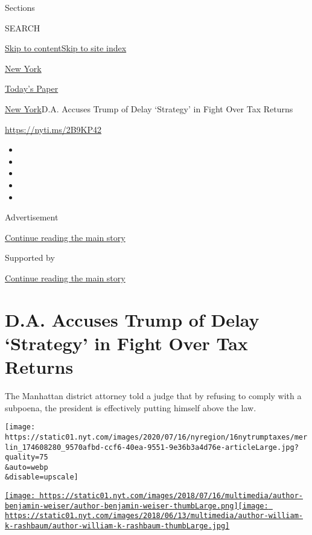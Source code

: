 Sections

SEARCH

\protect\hyperlink{site-content}{Skip to
content}\protect\hyperlink{site-index}{Skip to site index}

\href{https://www.nytimes.com/section/nyregion}{New York}

\href{https://myaccount.nytimes.com/auth/login?response_type=cookie\&client_id=vi}{}

\href{https://www.nytimes.com/section/todayspaper}{Today's Paper}

\href{/section/nyregion}{New York}\textbar{}D.A. Accuses Trump of Delay
`Strategy' in Fight Over Tax Returns

\url{https://nyti.ms/2B9KP42}

\begin{itemize}
\item
\item
\item
\item
\item
\end{itemize}

Advertisement

\protect\hyperlink{after-top}{Continue reading the main story}

Supported by

\protect\hyperlink{after-sponsor}{Continue reading the main story}

\hypertarget{da-accuses-trump-of-delay-strategy-in-fight-over-tax-returns}{%
\section{D.A. Accuses Trump of Delay `Strategy' in Fight Over Tax
Returns}\label{da-accuses-trump-of-delay-strategy-in-fight-over-tax-returns}}

The Manhattan district attorney told a judge that by refusing to comply
with a subpoena, the president is effectively putting himself above the
law.

\texttt{[image: https://static01.nyt.com/images/2020/07/16/nyregion/16nytrumptaxes/merlin\_174608280\_9570afbd-ccf6-40ea-9551-9e36b3a4d76e-articleLarge.jpg?quality=75\\\&auto=webp\\\&disable=upscale]}

\href{https://www.nytimes.com/by/benjamin-weiser}{\texttt{[image: https://static01.nyt.com/images/2018/07/16/multimedia/author-benjamin-weiser/author-benjamin-weiser-thumbLarge.png]}}\href{https://www.nytimes.com/by/william-k-rashbaum}{\texttt{[image: https://static01.nyt.com/images/2018/06/13/multimedia/author-william-k-rashbaum/author-william-k-rashbaum-thumbLarge.jpg]}}

